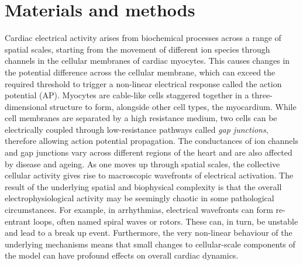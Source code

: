 \documentclass[utf8]{frontiersSCNS} %
\begin{document}
\section{Materials and methods}
\label{sec:methods}        
Cardiac electrical activity arises from biochemical processes across a range of spatial scales, starting from the movement of different ion species through channels in the cellular membranes of cardiac myocytes. This causes changes in the potential difference across the cellular membrane, which can exceed the required threshold to trigger a non-linear electrical response called the action potential (AP).
Myocytes are cable-like cells staggered together in a three-dimensional structure to form, alongside other cell types, the myocardium. While cell membranes are separated by a high resistance medium, two cells can be electrically coupled through low-resistance pathways called \textit{gap junctions}, therefore allowing action potential propagation.
The conductances of ion channels and gap junctions vary across different regions of the heart and are also affected by disease and ageing.
As one moves up through spatial scales, the collective cellular activity gives rise to macroscopic wavefronts of electrical activation.
The result of the underlying spatial and biophysical complexity is that the overall electrophysiological activity may be seemingly chaotic in some pathological circumstances. For example, in arrhythmias, electrical wavefronts can form re-entrant loops, often named spiral waves or rotors. These can, in turn, be unstable and lead to a break up event.
Furthermore, the very non-linear behaviour of the underlying mechanisms means that small changes to cellular-scale components of the model can have profound effects on overall cardiac dynamics.
\end{document}
